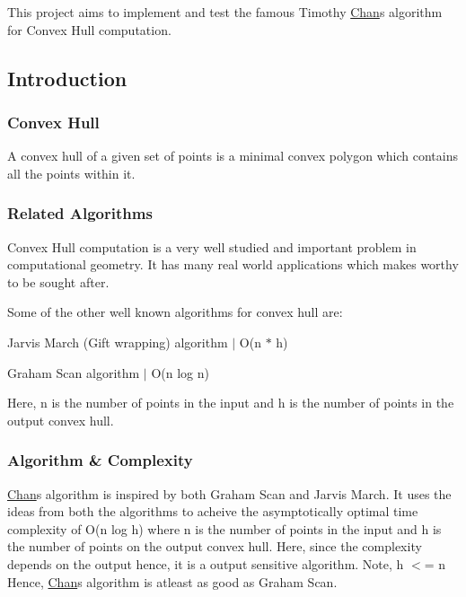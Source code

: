 This project aims to implement and test the famous Timothy \mbox{\hyperlink{classChan}{Chan}}\textquotesingle{}s algorithm for Convex Hull computation.

\subsection*{Introduction}

\subsubsection*{Convex Hull}

A convex hull of a given set of points is a minimal convex polygon which contains all the points within it.

\subsubsection*{Related Algorithms}

Convex Hull computation is a very well studied and important problem in computational geometry. It has many real world applications which makes worthy to be sought after.

Some of the other well known algorithms for convex hull are\+:
\begin{DoxyEnumerate}
\item Jarvis March (Gift wrapping) algorithm $\vert$ {\ttfamily O(n $\ast$ h)}
\item Graham Scan algorithm $\vert$ {\ttfamily O(n log n)}
\end{DoxyEnumerate}

Here, {\ttfamily n} is the number of points in the input and {\ttfamily h} is the number of points in the output convex hull.

\subsubsection*{Algorithm \& Complexity}

\mbox{\hyperlink{classChan}{Chan}}\textquotesingle{}s algorithm is inspired by both {\ttfamily Graham Scan} and {\ttfamily Jarvis March}. It uses the ideas from both the algorithms to acheive the asymptotically optimal time complexity of {\ttfamily O(n log h)} where {\ttfamily n} is the number of points in the input and {\ttfamily h} is the number of points on the output convex hull. Here, since the complexity depends on the output hence, it is a output sensitive algorithm. Note, {\ttfamily h $<$= n} Hence, \mbox{\hyperlink{classChan}{Chan}}\textquotesingle{}s algorithm is atleast as good as {\ttfamily Graham Scan}.

